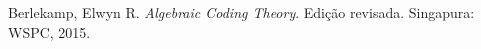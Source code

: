 \begin{thebibliography}{1}

Berlekamp, Elwyn R. \emph{Algebraic Coding Theory}. Edição revisada. Singapura: WSPC, 2015. 

\end{thebibliography}